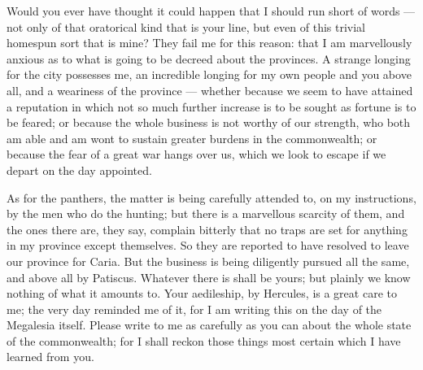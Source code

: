 

 Would you ever have thought it could happen that I should run short of words --- not only of that oratorical kind that is your line, but even of this trivial homespun sort that is mine? They fail me for this reason: that I am marvellously anxious as to what is going to be decreed about the provinces. A strange longing for the city possesses me, an incredible longing for my own people and you above all, and a weariness of the province --- whether because we seem to have attained a reputation in which not so much further increase is to be sought as fortune is to be feared; or because the whole business is not worthy of our strength, who both am able and am wont to sustain greater burdens in the commonwealth; or because the fear of a great war hangs over us, which we look to escape if we depart on the day appointed.

 As for the panthers, the matter is being carefully attended to, on my instructions, by the men who do the hunting; but there is a marvellous scarcity of them, and the ones there are, they say, complain bitterly that no traps are set for anything in my province except themselves. So they are reported to have resolved to leave our province for Caria. But the business is being diligently pursued all the same, and above all by Patiscus. Whatever there is shall be yours; but plainly we know nothing of what it amounts to. Your aedileship, by Hercules, is a great care to me; the very day reminded me of it, for I am writing this on the day of the Megalesia itself. Please write to me as carefully as you can about the whole state of the commonwealth; for I shall reckon those things most certain which I have learned from you.
